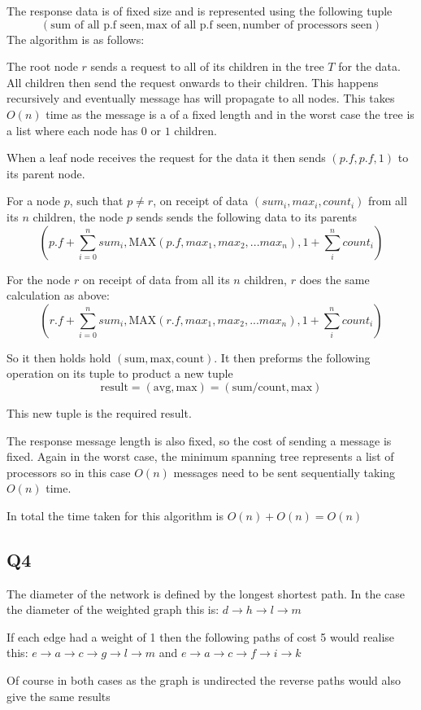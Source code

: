 \documentclass[11pt]{article}
\begin{document}
The response data is of fixed size and is represented using the following tuple
$$
(\text{sum of all p.f seen}, \text{max of all p.f seen}, \text{number of processors seen})
$$
The algorithm is as follows:

The root node $r$ sends a request to all of its children in the tree $T$ for the data. All children then send the request onwards to their children. This happens recursively and eventually  message has will propagate to all nodes. This takes $O(n)$ time as the message is a of a fixed length and in the worst case the tree is a list where each node has $0$ or $1$ children.

When a leaf node receives the request for the data it then sends $(p.f, p.f, 1)$ to its parent node.

For a node $p$, such that $p \neq r$, on receipt of data $(sum_i, max_i, count_i)$ from all its $n$ children, the node $p$ sends sends the following data to its parents 
$$
(p.f + \sum_{i=0}^n  sum_i, \text{MAX}(p.f, max_1, max_2, ... max_n), 1 + \sum_i^n count_i)
$$

For the node $r$ on receipt of data from all its $n$ children, $r$ does the same calculation as above:
$$(r.f + \sum_{i=0}^n  sum_i, \text{MAX}(r.f, max_1, max_2, ... max_n), 1 + \sum_i^n count_i)$$

So it then holds hold $(\text{sum}, \text{max}, \text{count})$.  It then preforms the following operation on its tuple to product a new tuple 
$$\text{result} = (\text{avg}, \text{max}) = (\text{sum/count}, \text{max})$$

This new tuple is the required result.

The response message length is also fixed, so the cost of sending a message is fixed.
Again in the worst case, the minimum spanning tree represents a list of processors so in this case $O(n)$ messages need to be sent sequentially taking $O(n)$ time.

In total the time taken for this algorithm is $O(n) + O(n) = O(n)$

\subsection*{Q4}
The diameter of the network is defined by the longest shortest path. In the case
the diameter of the weighted graph this is:
$d \rightarrow h \rightarrow l \rightarrow m$

If each edge had a weight of 1 then the following paths of cost 5 would realise this:
$ e \rightarrow a \rightarrow c \rightarrow g \rightarrow l \rightarrow m$ and
$e \rightarrow a \rightarrow c \rightarrow f \rightarrow i \rightarrow k$

Of course in both cases as the graph is undirected the reverse paths would also give the same results
\end{document}
